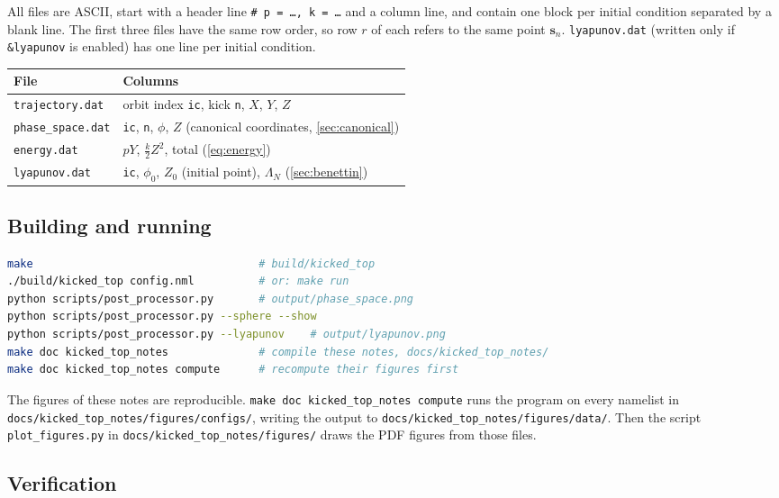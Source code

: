 \documentclass[11pt,a4paper]{article}
\newcommand{\vs}{\bm{s}}
\begin{document}
All files are ASCII, start with a header line \texttt{\# p = \dots, k = \dots} and a column line, and contain one
block per initial condition separated by a blank line. The first three files have the same row order, so row $r$ of
each refers to the same point $\vs_n$. \texttt{lyapunov.dat} (written only if \texttt{\&lyapunov} is enabled) has one line
per initial condition.
\begin{center}
\small
\begin{tabular}{ll}
  \toprule
  File & Columns \\
  \midrule
  \texttt{trajectory.dat} & orbit index \texttt{ic}, kick \texttt{n}, $X$, $Y$, $Z$ \\
  \texttt{phase\_space.dat} & \texttt{ic}, \texttt{n}, $\phi$, $Z$ \quad (canonical coordinates, \cref{sec:canonical}) \\
  \texttt{energy.dat} & $pY$, $\frac k2 Z^2$, total \quad (\cref{eq:energy}) \\
  \texttt{lyapunov.dat} & \texttt{ic}, $\phi_0$, $Z_0$ (initial point), $\Lambda_N$ \quad (\cref{sec:benettin}) \\
  \bottomrule
\end{tabular}
\end{center}

\subsection{Building and running}

\begin{lstlisting}[language=bash, numbers=none]
make                                   # build/kicked_top
./build/kicked_top config.nml          # or: make run
python scripts/post_processor.py       # output/phase_space.png
python scripts/post_processor.py --sphere --show
python scripts/post_processor.py --lyapunov    # output/lyapunov.png
make doc kicked_top_notes              # compile these notes, docs/kicked_top_notes/
make doc kicked_top_notes compute      # recompute their figures first
\end{lstlisting}
The figures of these notes are reproducible. \texttt{make doc kicked\_top\_notes compute} runs the program on every
namelist in \texttt{docs/kicked\_top\_notes/figures/configs/}, writing the output to
\texttt{docs/kicked\_top\_notes/figures/data/}. Then the script \texttt{plot\_figures.py} in
\texttt{docs/kicked\_top\_notes/figures/} draws the PDF figures from those files.

\subsection{Verification}
\end{document}
